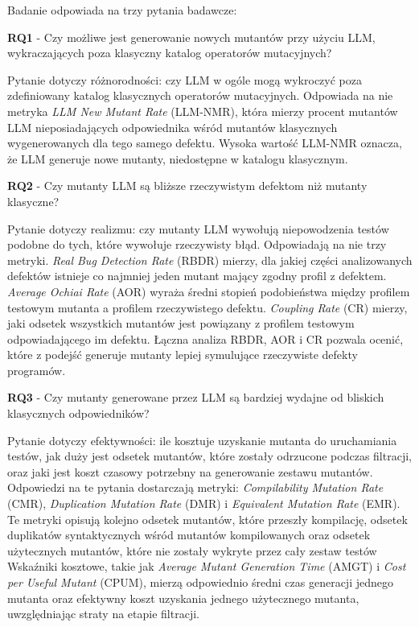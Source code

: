 \documentclass[12pt,a4paper,oldfontcommands]{memoir}
\theoremstyle{plain}
\theoremstyle{definition}
\theoremstyle{remark}
\begin{document}
    Badanie odpowiada na trzy pytania badawcze:

    \textbf{RQ1} - Czy możliwe jest generowanie nowych mutantów przy użyciu LLM, wykraczających poza klasyczny katalog operatorów mutacyjnych?

    Pytanie dotyczy różnorodności: czy LLM w ogóle mogą wykroczyć poza zdefiniowany katalog klasycznych operatorów mutacyjnych.
    Odpowiada na nie metryka \textit{LLM New Mutant Rate} (LLM-NMR), która mierzy procent mutantów LLM nieposiadających odpowiednika wśród mutantów klasycznych wygenerowanych dla tego samego defektu.
    Wysoka wartość LLM-NMR oznacza, że LLM generuje nowe mutanty, niedostępne w katalogu klasycznym.

    \textbf{RQ2} - Czy mutanty LLM są bliższe rzeczywistym defektom niż mutanty klasyczne?

    Pytanie dotyczy realizmu: czy mutanty LLM wywołują niepowodzenia testów podobne do tych, które wywołuje rzeczywisty błąd.
    Odpowiadają na nie trzy metryki. \textit{Real Bug Detection Rate} (RBDR) mierzy, dla jakiej części analizowanych defektów istnieje co najmniej jeden mutant mający zgodny profil z defektem.
    \textit{Average Ochiai Rate} (AOR) wyraża średni stopień podobieństwa między profilem testowym mutanta a profilem rzeczywistego defektu.
    \textit{Coupling Rate} (CR) mierzy, jaki odsetek wszystkich mutantów jest powiązany z profilem testowym odpowiadającego im defektu.
    Łączna analiza RBDR, AOR i CR pozwala ocenić, które z podejść generuje mutanty lepiej symulujące rzeczywiste defekty programów.

    \textbf{RQ3} - Czy mutanty generowane przez LLM są bardziej wydajne od bliskich klasycznych odpowiedników?

    Pytanie dotyczy efektywności: ile kosztuje uzyskanie mutanta do uruchamiania testów, jak duży jest odsetek mutantów, które zostały odrzucone podczas filtracji, oraz jaki jest koszt czasowy potrzebny na generowanie zestawu mutantów.
    Odpowiedzi na te pytania dostarczają metryki: \textit{Compilability Mutation Rate} (CMR), \textit{Duplication Mutation Rate} (DMR) i \textit{Equivalent Mutation Rate} (EMR).
    Te metryki opisują kolejno odsetek mutantów, które przeszły kompilację, odsetek duplikatów syntaktycznych wśród mutantów kompilowanych oraz odsetek użytecznych mutantów, które nie zostały wykryte przez cały zestaw testów
    Wskaźniki kosztowe, takie jak \textit{Average Mutant Generation Time} (AMGT) i \textit{Cost per Useful Mutant} (CPUM), mierzą odpowiednio średni czas generacji jednego mutanta oraz efektywny koszt uzyskania jednego użytecznego mutanta, uwzględniając straty na etapie filtracji.
\end{document}
